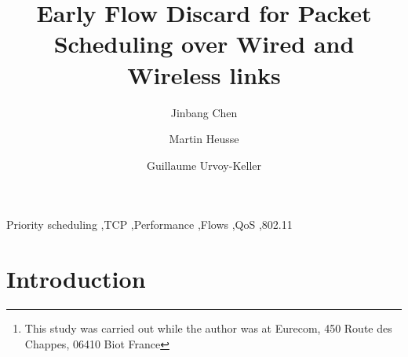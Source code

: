 \documentclass[preprint,12pt]{elsarticle}
\begin{document}
\begin{frontmatter}



\title{Early Flow Discard for Packet Scheduling over Wired and Wireless links}


\author[*]{Jinbang Chen}
\author[**]{Martin Heusse}
\author[***]{Guillaume Urvoy-Keller}
\address[*]{East China Normal University, China\footnote{This study was carried out while the author was at Eurecom, 450 Route des Chappes, 06410 Biot France}}
\address[**]{Laboratoire LIG CNRS UMR 5217, Grenoble, France}
\address[***]{Univ. Nice Sophia Antipolis, CNRS, I3S, UMR 7271, 06900 Sophia Antipolis}
\begin{abstract}

\end{abstract}

\begin{keyword}
Priority scheduling \sep TCP \sep Performance \sep Flows \sep QoS \sep 802.11


\end{keyword}

\end{frontmatter}


\section{Introduction}
\label{sec:intro}
\end{document}
